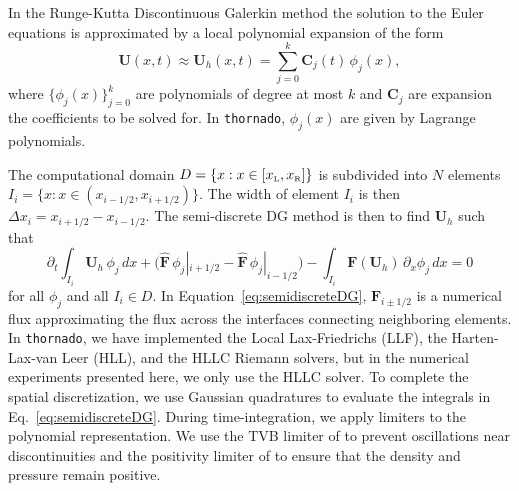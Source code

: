 \documentclass[10pt]{article}
\newcommand{\thornado}{\texttt{thornado}}
\begin{document}
In the Runge-Kutta Discontinuous Galerkin \citep[RKDG; cf.][]{cockburnShu_2001} method the solution to the Euler equations is approximated by a local polynomial expansion of the form
\begin{equation}
  \boldsymbol{U}(x,t)
  \approx\boldsymbol{U}_{h}(x,t)=\sum_{j=0}^{k}\boldsymbol{C}_{j}(t)\,\phi_{j}(x),
\end{equation}
where $\{\phi_{j}(x)\}_{j=0}^{k}$ are polynomials of degree at most $k$ and $\boldsymbol{C}_{j}$ are expansion the coefficients to be solved for.  
In \thornado, $\phi_{j}(x)$ are given by Lagrange polynomials.  

The computational domain $D=\{x:x\in[x_{\mbox{\tiny L}},x_{\mbox{\tiny R}}]\}$ is subdivided into $N$ elements $I_{i}=\{x:x\in(x_{i-1/2},x_{i+1/2})\}$.  
The width of element $I_{i}$ is then $\Delta x_{i}=x_{i+1/2}-x_{i-1/2}$.  
The semi-discrete DG method is then to find $\boldsymbol{U}_{h}$ such that
\begin{equation}
  \partial_{t}\int_{I_{i}}\boldsymbol{U}_{h}\,\phi_{j}\,dx
  +\big(\widehat{\boldsymbol{F}}\,\phi_{j}|_{i+1/2}-\widehat{\boldsymbol{F}}\,\phi_{j}|_{i-1/2}\big)
  -\int_{I_{i}}\boldsymbol{F}(\boldsymbol{U}_{h})\,\partial_{x}\phi_{j}\,dx=0
  \label{eq:semidiscreteDG}
\end{equation}
for all $\phi_{j}$ and all $I_{i}\in D$.  
In Equation~\eqref{eq:semidiscreteDG}, $\widehat{\boldsymbol{F}}_{i\pm1/2}$ is a numerical flux approximating the flux across the interfaces connecting neighboring elements.  
In \thornado, we have implemented the Local Lax-Friedrichs (LLF), the Harten-Lax-van Leer (HLL), and the HLLC Riemann solvers, but in the numerical experiments presented here, we only use the HLLC solver.  
To complete the spatial discretization, we use Gaussian quadratures to evaluate the integrals in Eq.~\eqref{eq:semidiscreteDG}.  
During time-integration, we apply limiters to the polynomial representation.  
We use the TVB limiter of \citet{} to prevent oscillations near discontinuities and the positivity limiter of \citet{ZhangShu2010} to ensure that the density and pressure remain positive.  
\end{document}
